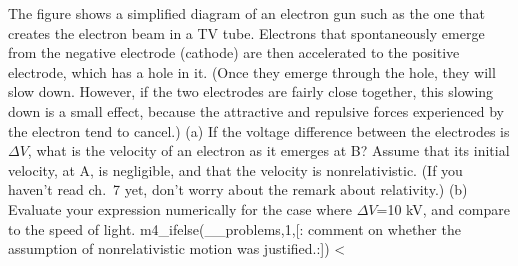        The figure shows a simplified diagram of an electron
        gun such as the 
        one that creates the electron beam in a TV tube. Electrons
        that spontaneously emerge from the negative electrode
        (cathode) are then accelerated to the positive electrode,
        which has a hole in it. (Once they emerge through the hole,
        they will slow down. However, if the two electrodes are
        fairly close together, this slowing down is a small effect,
        because the attractive and repulsive forces experienced by
        the electron tend to cancel.) \hwendpart
        (a) If the voltage difference
        between the electrodes is $\Delta V$, what is the velocity
        of an electron as it emerges at B? Assume that its initial
        velocity, at A, is negligible, and that the velocity is nonrelativistic. 
        (If you haven't read ch.~7 yet, don't worry about the remark about
        relativity.)
        \answercheck\hwendpart
        (b) Evaluate your
        expression numerically for the case where $\Delta V$=10 kV,
        and compare to the speed of light.
        m4_ifelse(__problems,1,[:%
        comment on whether the assumption
        of nonrelativistic motion was justified.:])%
        <%
